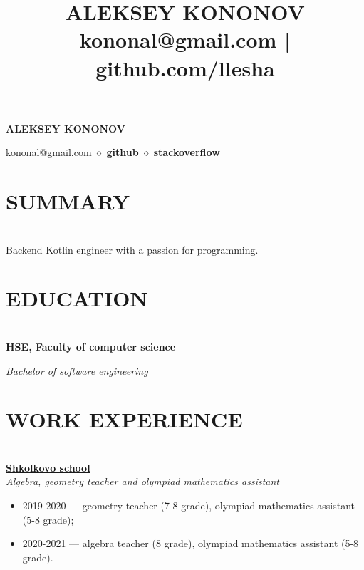 \documentclass{article}
\title{ALEKSEY KONONOV\\\normalsize{kononal@gmail.com | github.com/llesha}}
\date{ }
\begin{document}
\begin{center}
\huge{\textbf{\quad \quad \quad \quad \quad \quad ALEKSEY KONONOV}}

\normalsize{\hspace{4.5cm} kononal@gmail.com $\diamond$ \href{https://github.com/llesha}{{\textbf{\underline{github}}}}} $\diamond$ \href{https://stackoverflow.com/users/19933941/llesha}{{\textbf{\underline{stackoverflow}}}}
\end{center}

\section*{SUMMARY}
\makebox[530pt]{\rule{570pt}{0.4pt}}\\
\noindent Backend Kotlin engineer with a passion for programming.

\section*{EDUCATION}
\makebox[530pt]{\rule{570pt}{0.4pt}}\\

\noindent\textbf{HSE, Faculty of computer science}

\noindent \textit{Bachelor of software engineering}

\section*{WORK EXPERIENCE}
\makebox[530pt]{\rule{570pt}{0.4pt}}\\

\noindent\href{https://shkolkovo.net/}{{\textbf{\underline{Shkolkovo school}}}}
\\\textit{Algebra, geometry teacher and olympiad mathematics assistant}
\begin{itemize}
 \item 2019-2020 — geometry teacher (7-8 grade), olympiad mathematics assistant (5-8 grade);
 \item 2020-2021 — algebra teacher (8 grade), olympiad mathematics assistant (5-8 grade).
\end{itemize}
\end{document}
